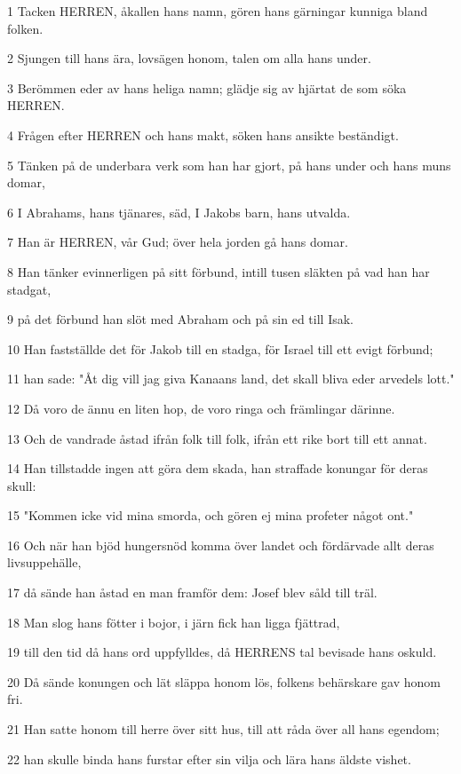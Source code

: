 \par 1 Tacken HERREN, åkallen hans namn, gören hans gärningar kunniga bland folken.
\par 2 Sjungen till hans ära, lovsägen honom, talen om alla hans under.
\par 3 Berömmen eder av hans heliga namn; glädje sig av hjärtat de som söka HERREN.
\par 4 Frågen efter HERREN och hans makt, söken hans ansikte beständigt.
\par 5 Tänken på de underbara verk som han har gjort, på hans under och hans muns domar,
\par 6 I Abrahams, hans tjänares, säd, I Jakobs barn, hans utvalda.
\par 7 Han är HERREN, vår Gud; över hela jorden gå hans domar.
\par 8 Han tänker evinnerligen på sitt förbund, intill tusen släkten på vad han har stadgat,
\par 9 på det förbund han slöt med Abraham och på sin ed till Isak.
\par 10 Han fastställde det för Jakob till en stadga, för Israel till ett evigt förbund;
\par 11 han sade: "Åt dig vill jag giva Kanaans land, det skall bliva eder arvedels lott."
\par 12 Då voro de ännu en liten hop, de voro ringa och främlingar därinne.
\par 13 Och de vandrade åstad ifrån folk till folk, ifrån ett rike bort till ett annat.
\par 14 Han tillstadde ingen att göra dem skada, han straffade konungar för deras skull:
\par 15 "Kommen icke vid mina smorda, och gören ej mina profeter något ont."
\par 16 Och när han bjöd hungersnöd komma över landet och fördärvade allt deras livsuppehälle,
\par 17 då sände han åstad en man framför dem: Josef blev såld till träl.
\par 18 Man slog hans fötter i bojor, i järn fick han ligga fjättrad,
\par 19 till den tid då hans ord uppfylldes, då HERRENS tal bevisade hans oskuld.
\par 20 Då sände konungen och lät släppa honom lös, folkens behärskare gav honom fri.
\par 21 Han satte honom till herre över sitt hus, till att råda över all hans egendom;
\par 22 han skulle binda hans furstar efter sin vilja och lära hans äldste vishet.
